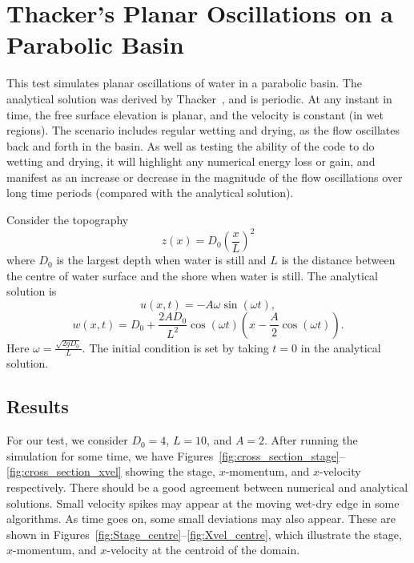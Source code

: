 \section{Thacker's Planar Oscillations on a Parabolic Basin}
This test simulates planar oscillations of water in a parabolic basin. The analytical solution was derived by Thacker~\cite{Thacker1981}, and is periodic. At any instant in time, the free surface elevation is planar, and the velocity is constant (in wet regions). The scenario includes regular wetting and drying, as the flow oscillates back and forth in the basin. As well as testing the ability of the code to do wetting and drying, it will highlight any numerical energy loss or gain, and manifest as an increase or decrease in the magnitude of the flow oscillations over long time periods (compared with the analytical solution). 

Consider the topography
\begin{equation}
z(x) = D_0 \left(\frac{x}{L}\right)^2
\end{equation}
where $D_0$ is the largest depth when water is still and $L$ is the distance between the centre of water surface and the shore when water is still.
The analytical solution is 
\begin{equation}
u(x,t) = -A \omega \sin(\omega t),
\end{equation}
\begin{equation}
w(x,t) = D_0 + \frac{2 A D_0}{L^2} \cos(\omega t) \left( x - \frac{A}{2}\cos(\omega t) \right).
\end{equation}
Here $\omega=\frac{\sqrt{2 g D_0}}{L}$.
The initial condition is set by taking $t=0$ in the analytical solution.


\subsection{Results}
For our test, we consider $D_0=4$, $L=10$, and $A=2$. After running the simulation for some time, we have Figures~\ref{fig:cross_section_stage}--\ref{fig:cross_section_xvel} showing the stage, $x$-momentum, and $x$-velocity respectively. There should be a good agreement between numerical and analytical solutions. Small velocity spikes may appear at the moving wet-dry edge in some \anuga{} algorithms. As time goes on, some small deviations may also appear. These are shown in Figures~\ref{fig:Stage_centre}--\ref{fig:Xvel_centre}, which illustrate the stage, $x$-momentum, and $x$-velocity at the centroid of the domain.


